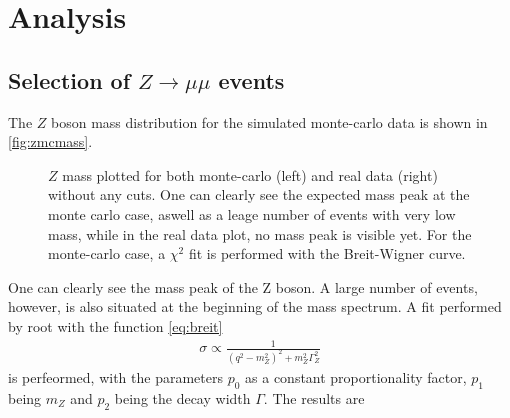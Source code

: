 \documentclass[twoside,        %
               BCOR12mm,       %
               ngerman,english, %
               fleqn,headsepline=false,footsepline=false
              ]{Vorlage/MFPREPORT}
\begin{document}
\section{Analysis}
\label{sec:analysis}
\subsection{Selection of $Z \rightarrow \mu\mu$ events}
The $Z$ boson mass distribution for the simulated monte-carlo data is shown in
\cref{fig:zmcmass}.
\begin{figure}
    \caption{$Z$ mass plotted for both monte-carlo (left) and real data (right)
    without any cuts. One can clearly see the expected mass peak at the monte
    carlo case, aswell as a leage number of events with very low mass, while in
    the real data plot, no mass peak is visible yet. For the monte-carlo case,
    a $\chi^2$ fit is performed with the Breit-Wigner curve.}
\end{figure}
One can clearly see the mass peak of the Z boson. A large number of events,
however, is also situated at the beginning of the mass spectrum. A fit
performed by root with the function \ref{eq:breit}
\begin{align}
    \sigma\propto\frac{1}{(q^2-m_Z^2)^2+m_Z^2\Gamma_Z^2}
    \label{eq:breit}
\end{align}
is perfeormed, with the parameters $p_0$ as a constant proportionality factor,
$p_1$ being $m_Z$ and $p_2$ being the decay width $\Gamma$. The results are
\end{document}
